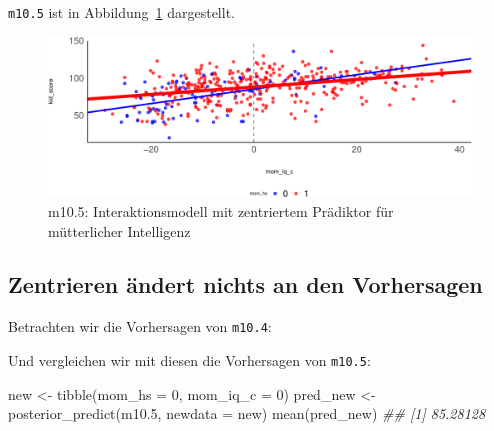 \documentclass[
  a4paper,
  DIV=11]{scrreprt}
\newenvironment{Shaded}{\begin{snugshade}}{\end{snugshade}}
\newcommand{\AttributeTok}[1]{\textcolor[rgb]{0.40,0.45,0.13}{#1}}
\newcommand{\DecValTok}[1]{\textcolor[rgb]{0.68,0.00,0.00}{#1}}
\newcommand{\DocumentationTok}[1]{\textcolor[rgb]{0.37,0.37,0.37}{\textit{#1}}}
\newcommand{\FloatTok}[1]{\textcolor[rgb]{0.68,0.00,0.00}{#1}}
\newcommand{\FunctionTok}[1]{\textcolor[rgb]{0.28,0.35,0.67}{#1}}
\newcommand{\NormalTok}[1]{\textcolor[rgb]{0.00,0.23,0.31}{#1}}
\newcommand{\OtherTok}[1]{\textcolor[rgb]{0.00,0.23,0.31}{#1}}
\newcommand{\SpecialCharTok}[1]{\textcolor[rgb]{0.37,0.37,0.37}{#1}}
\theoremstyle{definition}
\theoremstyle{remark}
\begin{document}
\texttt{m10.5} ist in Abbildung~\ref{fig-m105} dargestellt.

\begin{figure}

{\centering \includegraphics{./metrische-AV_files/figure-pdf/fig-m105-1.pdf}

}

\caption{\label{fig-m105}m10.5: Interaktionsmodell mit zentriertem
Prädiktor für mütterlicher Intelligenz}

\end{figure}

\hypertarget{zentrieren-uxe4ndert-nichts-an-den-vorhersagen}{%
\subsection{Zentrieren ändert nichts an den
Vorhersagen}\label{zentrieren-uxe4ndert-nichts-an-den-vorhersagen}}

Betrachten wir die Vorhersagen von \texttt{m10.4}:

\begin{Shaded}
\end{Shaded}

Und vergleichen wir mit diesen die Vorhersagen von \texttt{m10.5}:

\begin{Shaded}
\begin{Highlighting}[]
\NormalTok{new }\OtherTok{\textless{}{-}} \FunctionTok{tibble}\NormalTok{(}\AttributeTok{mom\_hs =} \DecValTok{0}\NormalTok{, }\AttributeTok{mom\_iq\_c =} \DecValTok{0}\NormalTok{)}
\NormalTok{pred\_new }\OtherTok{\textless{}{-}} \FunctionTok{posterior\_predict}\NormalTok{(m10}\FloatTok{.5}\NormalTok{, }\AttributeTok{newdata =}\NormalTok{ new)}
\FunctionTok{mean}\NormalTok{(pred\_new)}
\DocumentationTok{\#\# [1] 85.28128}
\end{Highlighting}
\end{Shaded}
\end{document}
